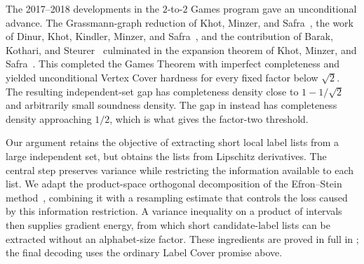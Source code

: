 The 2017--2018 developments in the \(2\)-to-\(2\) Games program
gave an unconditional advance. The Grassmann-graph reduction of Khot, Minzer, and
Safra~\cite{KhotMinzerSafra2025}, the work of Dinur, Khot, Kindler,
Minzer, and Safra~\cite{DKKMS2025}, and the contribution of Barak,
Kothari, and Steurer~\cite{BarakKothariSteurer2019} culminated in
the expansion theorem of Khot, Minzer, and
Safra~\cite{KhotMinzerSafra2023}. This completed the Games Theorem
with imperfect completeness and yielded unconditional Vertex Cover
hardness for every fixed factor below \(\sqrt2\). The resulting
independent-set gap has completeness density close to
\(1-1/\sqrt2\) and arbitrarily small soundness density. The gap
in  instead has completeness density approaching
\(1/2\), which is what gives the factor-two threshold.

Our argument retains the objective of extracting short local label
lists from a large independent set, but obtains the lists from
Lipschitz derivatives. The central step preserves variance while
restricting the information available to each list. We adapt the
product-space orthogonal decomposition of the Efron--Stein
method~\cite[Section~2]{EfronStein1981}, combining it with a
resampling estimate that controls the loss caused by this information
restriction. A variance inequality on a product of intervals then
supplies gradient energy, from which short candidate-label lists can
be extracted without an alphabet-size factor. These ingredients
are proved in full in ;
the final decoding uses the ordinary Label Cover promise above.
